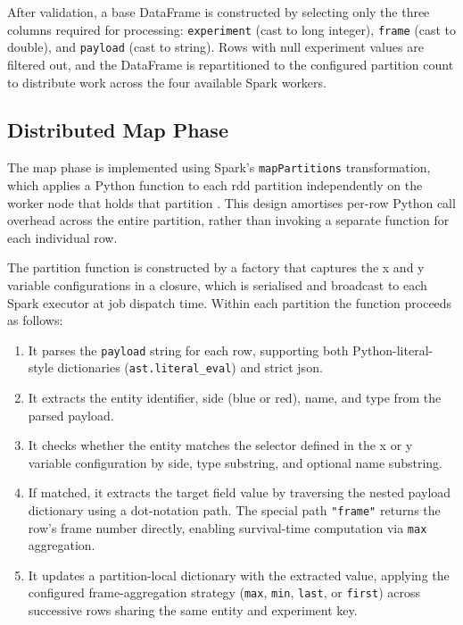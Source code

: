 After validation, a base DataFrame is constructed by selecting only the three columns required
for processing: \texttt{experiment} (cast to long integer), \texttt{frame} (cast to double), and
\texttt{payload} (cast to string). Rows with null experiment values are filtered out, and the
DataFrame is repartitioned to the configured partition count to distribute work across the four
available Spark workers.

\subsection{Distributed Map Phase}
\label{subsec:map-phase}

The map phase is implemented using Spark's \texttt{mapPartitions} transformation, which applies a
Python function to each \gls{rdd} partition independently on the worker node that holds that
partition \parencite{zaharia2012rdd}. This design amortises per-row Python call overhead across
the entire partition, rather than invoking a separate function for each individual row.

The partition function is constructed by a factory that captures the x and y variable
configurations in a closure, which is serialised and broadcast to each Spark executor at job
dispatch time. Within each partition the function proceeds as follows:

\begin{enumerate}
    \item It parses the \texttt{payload} string for each row, supporting both Python-literal-style
          dictionaries (\texttt{ast.literal\_eval}) and strict \gls{json}.
    \item It extracts the entity identifier, side (blue or red), name, and type from the parsed
          payload.
    \item It checks whether the entity matches the selector defined in the x or y variable
          configuration by side, type substring, and optional name substring.
    \item If matched, it extracts the target field value by traversing the nested payload
          dictionary using a dot-notation path. The special path \texttt{"frame"} returns the
          row's frame number directly, enabling survival-time computation via \texttt{max}
          aggregation.
    \item It updates a partition-local dictionary with the extracted value, applying the
          configured frame-aggregation strategy (\texttt{max}, \texttt{min}, \texttt{last}, or
          \texttt{first}) across successive rows sharing the same entity and experiment key.
\end{enumerate}

